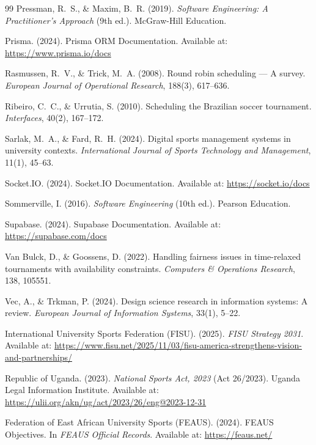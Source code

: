\documentclass[12pt,a4paper]{report}
\begin{document}
\begin{thebibliography}{99}
Pressman, R.~S., \& Maxim, B.~R. (2019). \textit{Software Engineering: A Practitioner's Approach} (9th ed.). McGraw-Hill Education.

Prisma. (2024). Prisma ORM Documentation. Available at: \url{https://www.prisma.io/docs}

Rasmussen, R.~V., \& Trick, M.~A. (2008). Round robin scheduling --- A survey. \textit{European Journal of Operational Research}, 188(3), 617--636.

Ribeiro, C.~C., \& Urrutia, S. (2010). Scheduling the Brazilian soccer tournament. \textit{Interfaces}, 40(2), 167--172.

Sarlak, M.~A., \& Fard, R.~H. (2024). Digital sports management systems in university contexts. \textit{International Journal of Sports Technology and Management}, 11(1), 45--63.

Socket.IO. (2024). Socket.IO Documentation. Available at: \url{https://socket.io/docs}

Sommerville, I. (2016). \textit{Software Engineering} (10th ed.). Pearson Education.

Supabase. (2024). Supabase Documentation. Available at: \url{https://supabase.com/docs}

Van Bulck, D., \& Goossens, D. (2022). Handling fairness issues in time-relaxed tournaments with availability constraints. \textit{Computers \& Operations Research}, 138, 105551.

Vec, A., \& Trkman, P. (2024). Design science research in information systems: A review. \textit{European Journal of Information Systems}, 33(1), 5--22.


International University Sports Federation (FISU). (2025). \textit{FISU Strategy 2031}. Available at: \url{https://www.fisu.net/2025/11/03/fisu-america-strengthens-vision-and-partnerships/}

Republic of Uganda. (2023). \textit{National Sports Act, 2023} (Act 26/2023). Uganda Legal Information Institute. Available at: \url{https://ulii.org/akn/ug/act/2023/26/eng@2023-12-31}

Federation of East African University Sports (FEAUS). (2024). FEAUS Objectives. In \textit{FEAUS Official Records}. Available at: \url{https://feaus.net/}


\end{thebibliography}
\end{document}
